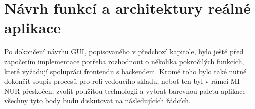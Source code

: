 \chapter{Návrh funkcí a architektury reálné aplikace}

Po dokončení návrhu GUI, popisovaného v předchozí kapitole, bylo ještě před započetím implementace potřeba rozhodnout o několika pokročilých funkcích, které vyžadují spolupráci frontendu s backendem. Kromě toho bylo také nutné dokončit soupis procesů pro roli vedoucího skladu, neboť ten byl v rámci MI-NUR přeskočen, zvolit použitou technologii a vybrat barevnou paletu aplikace - všechny tyto body budu diskutovat na následujících řádcích.









